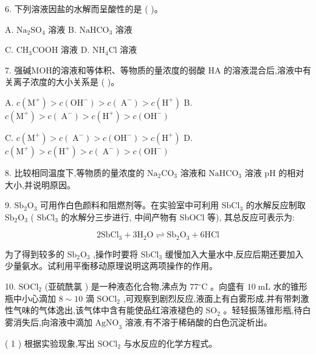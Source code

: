 \documentclass[10pt]{article}
\begin{document}
6. 下列溶液因盐的水解而呈酸性的是 ( )。

A. \({\mathrm{{Na}}}_{2}{\mathrm{{SO}}}_{4}\) 溶液 B. \({\mathrm{{NaHCO}}}_{3}\) 溶液

C. \({\mathrm{{CH}}}_{3}\mathrm{{COOH}}\) 溶液 D. \({\mathrm{{NH}}}_{4}\mathrm{{Cl}}\) 溶液

7. 强碱MOH的溶液和等体积、等物质的量浓度的弱酸 \(\mathrm{{HA}}\) 的溶液混合后,溶液中有关离子浓度的大小关系是 ( )。

A. \(c\left( {\mathrm{M}}^{ + }\right) > c\left( {\mathrm{{OH}}}^{ - }\right) > c\left( {\mathrm{\;A}}^{ - }\right) > c\left( {\mathrm{H}}^{ + }\right)\) B. \(c\left( {\mathrm{M}}^{ + }\right) > c\left( {\mathrm{\;A}}^{ - }\right) > c\left( {\mathrm{H}}^{ + }\right) > c\left( {\mathrm{{OH}}}^{ - }\right)\)

C. \(c\left( {\mathrm{M}}^{ + }\right) > c\left( {\mathrm{\;A}}^{ - }\right) > c\left( {\mathrm{{OH}}}^{ - }\right) > c\left( {\mathrm{H}}^{ + }\right)\) D. \(c\left( {\mathrm{M}}^{ + }\right) > c\left( {\mathrm{H}}^{ + }\right) > c\left( {\mathrm{\;A}}^{ - }\right) > c\left( {\mathrm{{OH}}}^{ - }\right)\)

8. 比较相同温度下,等物质的量浓度的 \({\mathrm{{Na}}}_{2}{\mathrm{{CO}}}_{3}\) 溶液和 \({\mathrm{{NaHCO}}}_{3}\) 溶液 \(\mathrm{{pH}}\) 的相对大小,并说明原因。

9. \({\mathrm{{Sb}}}_{2}{\mathrm{O}}_{3}\) 可用作白色颜料和阻燃剂等。在实验室中可利用 \({\mathrm{{SbCl}}}_{3}\) 的水解反应制取 \({\mathrm{{Sb}}}_{2}{\mathrm{O}}_{3}\) ( \({\mathrm{{SbCl}}}_{3}\) 的水解分三步进行, 中间产物有 SbOCl 等), 其总反应可表示为:

\[
2{\mathrm{{SbCl}}}_{3} + 3{\mathrm{H}}_{2}\mathrm{O} \rightleftharpoons {\mathrm{{Sb}}}_{2}{\mathrm{O}}_{3} + 6\mathrm{{HCl}}
\]

为了得到较多的 \({\mathrm{{Sb}}}_{2}{\mathrm{O}}_{3}\) ,操作时要将 \({\mathrm{{SbCl}}}_{3}\) 缓慢加入大量水中,反应后期还要加入少量氨水。试利用平衡移动原理说明这两项操作的作用。

10. \({\mathrm{{SOCl}}}_{2}\) (亚硫酰氯 ) 是一种液态化合物,沸点为 \({77}{}^{ \circ }\mathrm{C}\) 。向盛有 \({10}\mathrm{\;{mL}}\) 水的锥形瓶中小心滴加 \(8 \sim {10}\) 滴 \({\mathrm{{SOCl}}}_{2}\) ,可观察到剧烈反应,液面上有白雾形成,并有带刺激性气味的气体逸出,该气体中含有能使品红溶液褪色的 \({\mathrm{{SO}}}_{2}\) 。轻轻振荡锥形瓶,待白雾消失后,向溶液中滴加 \({\mathrm{{AgNO}}}_{3}\) 溶液,有不溶于稀硝酸的白色沉淀析出。

( 1 ) 根据实验现象,写出 \({\mathrm{{SOCl}}}_{2}\) 与水反应的化学方程式。
\end{document}
